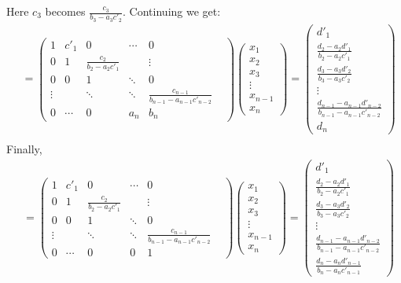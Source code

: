 \documentclass[12pt]{article}
\begin{document}
    Here $c_3$ becomes $\frac{c_3}{b_3 - a_3c'_2}$. Continuing we get:
    \begin{align*}
      &=\begin{pmatrix}
        1 & c'_1 & 0 & \cdots & 0 \\
        0 & 1 & \frac{c_2}{b_2 - a_2c'_1} & & \vdots \\
       0 & 0 & 1 & \ddots & 0 & \\
      \vdots & & \ddots & \ddots & \frac{c_{n-1}}{b_{n-1} - a_{n-1}c'_{n-2}} \\ 
      0 & \cdots & 0 & a_n & b_n
      \end{pmatrix}
      \begin{pmatrix}
      x_1 \\ x_2 \\ x_3 \\ \vdots \\x_{n-1} \\ x_n 
      \end{pmatrix}
      = 
      \begin{pmatrix}
        d'_1 \\ \frac{d_2 - a_2d'_1}{b_2 - a_2c'_1} \\ \frac{d_3 - a_3d'_2}{b_3 - a_3c'_2} \\ \vdots \\ \frac{d_{n-1} - a_{n-1}d'_{n-2}}{b_{n-1} - a_{n-1}c'_{n-2}}\\ d_n 
      \end{pmatrix} \\[10pt]
    \end{align*}
    Finally,
    \begin{align*}
        &=\begin{pmatrix}
          1 & c'_1 & 0 & \cdots & 0 \\
          0 & 1 & \frac{c_2}{b_2 - a_2c'_1} & & \vdots \\
         0 & 0 & 1 & \ddots & 0 & \\
        \vdots & & \ddots & \ddots & \frac{c_{n-1}}{b_{n-1} - a_{n-1}c'_{n-2}} \\ 
        0 & \cdots & 0 & 0 & 1
        \end{pmatrix}
        \begin{pmatrix}
        x_1 \\ x_2 \\ x_3 \\ \vdots \\x_{n-1} \\ x_n 
        \end{pmatrix}
        = 
        \begin{pmatrix}
          d'_1 \\ \frac{d_2 - a_2d'_1}{b_2 - a_2c'_1} \\ \frac{d_3 - a_3d'_2}{b_3 - a_3c'_2} \\ \vdots \\ \frac{d_{n-1} - a_{n-1}d'_{n-2}}{b_{n-1} - a_{n-1}c'_{n-2}}\\ \frac{d_{n} - a_{n}d'_{n-1}}{b_{n} - a_{n}c'_{n-1}} 
        \end{pmatrix} \\[10pt]
      \end{align*}
\end{document}
